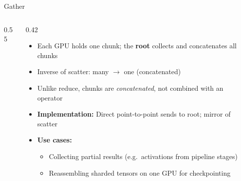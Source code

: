 \begin{frame}{Gather}
\begin{columns}
\begin{column}{0.55\textwidth}
\begin{center}
      \end{center}
    \end{column}
    \begin{column}{0.42\textwidth}
      \begin{itemize}
        \item Each GPU holds one chunk; the \textbf{root} collects and concatenates all chunks
        \item Inverse of scatter: many $\to$ one (concatenated)
        \item Unlike reduce, chunks are \emph{concatenated}, not combined with an operator
        \item \textbf{Implementation:} Direct point-to-point sends to root; mirror of scatter
        \item \textbf{Use cases:}
          \begin{itemize}
            \item Collecting partial results (e.g.\ activations from pipeline stages)
            \item Reassembling sharded tensors on one GPU for checkpointing
          \end{itemize}
      \end{itemize}
    \end{column}
  \end{columns}
\end{frame}

